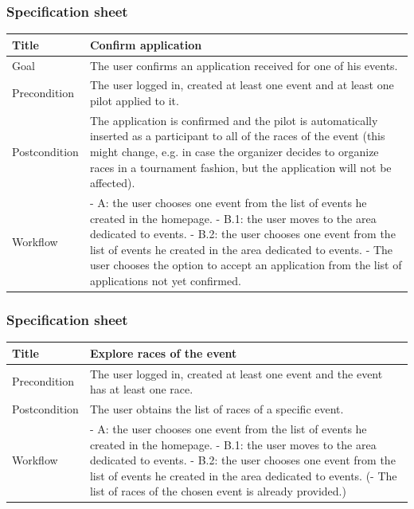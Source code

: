 \documentclass{beamer}
\begin{document}
\begin{frame}
    \frametitle{Specification sheet}
    \begin{table}
        \tiny
        \begin{tabular}{|p{2cm}|p{6cm}|}
        \hline
        Title & \textbf{Confirm application} \\
        \hline
        Goal & The user confirms an application received for one of his events. \\
        \hline
        Precondition & The user logged in, created at least one event and at least one pilot applied to it.\\
        \hline
        Postcondition & The application is confirmed and the pilot is automatically inserted as a participant
        to all of the races of the event (this might change, e.g. in case the organizer decides to organize races 
        in a tournament fashion, but the application will not be affected). \\
        \hline
        Workflow &
        - A: the user chooses one event from the list of events he created in the homepage. \newline
        - B.1: the user moves to the area dedicated to events. \newline
        - B.2: the user chooses one event from the list of events he created in the area dedicated to events. \newline
        - The user chooses the option to accept an application from the list of applications not yet confirmed. \\
        \hline
        \end{tabular}
\end{table}
\end{frame}

\begin{frame}
    \frametitle{Specification sheet}
    \begin{table}
        \tiny
        \begin{tabular}{|p{2cm}|p{6cm}|}
        \hline
        Title & \textbf{Explore races of the event} \\
        \hline
        Precondition & The user logged in, created at least one event and the event has at least one race. \\
        \hline
        Postcondition & The user obtains the list of races of a specific event. \\
        \hline
        Workflow &
        - A: the user chooses one event from the list of events he created in the homepage. \newline
        - B.1: the user moves to the area dedicated to events. \newline
        - B.2: the user chooses one event from the list of events he created in the area dedicated to events. \newline
        (- The list of races of the chosen event is already provided.) \\
        \hline
        \end{tabular}
\end{table}
\end{frame}
\end{document}

